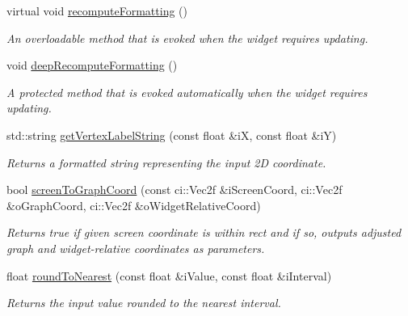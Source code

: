 \begin{DoxyCompactItemize}
\item 
\hypertarget{class_gui_plot_a718bfecbf285f346fb31cae1ab2cb085}{virtual void \hyperlink{class_gui_plot_a718bfecbf285f346fb31cae1ab2cb085}{recompute\-Formatting} ()}\label{class_gui_plot_a718bfecbf285f346fb31cae1ab2cb085}

\begin{DoxyCompactList}\small\item\em An overloadable method that is evoked when the widget requires updating. \end{DoxyCompactList}\item 
\hypertarget{class_gui_plot_aeb458e8d702ec1eed13ddf3f4fe1f492}{void \hyperlink{class_gui_plot_aeb458e8d702ec1eed13ddf3f4fe1f492}{deep\-Recompute\-Formatting} ()}\label{class_gui_plot_aeb458e8d702ec1eed13ddf3f4fe1f492}

\begin{DoxyCompactList}\small\item\em A protected method that is evoked automatically when the widget requires updating. \end{DoxyCompactList}\item 
\hypertarget{class_gui_plot_a0f3e7eb075608be8efbdc7a667e48f26}{std\-::string \hyperlink{class_gui_plot_a0f3e7eb075608be8efbdc7a667e48f26}{get\-Vertex\-Label\-String} (const float \&i\-X, const float \&i\-Y)}\label{class_gui_plot_a0f3e7eb075608be8efbdc7a667e48f26}

\begin{DoxyCompactList}\small\item\em Returns a formatted string representing the input 2\-D coordinate. \end{DoxyCompactList}\item 
\hypertarget{class_gui_plot_a6efee73c07e1a6eab9e574e3f875d2ad}{bool \hyperlink{class_gui_plot_a6efee73c07e1a6eab9e574e3f875d2ad}{screen\-To\-Graph\-Coord} (const ci\-::\-Vec2f \&i\-Screen\-Coord, ci\-::\-Vec2f \&o\-Graph\-Coord, ci\-::\-Vec2f \&o\-Widget\-Relative\-Coord)}\label{class_gui_plot_a6efee73c07e1a6eab9e574e3f875d2ad}

\begin{DoxyCompactList}\small\item\em Returns true if given screen coordinate is within rect and if so, outputs adjusted graph and widget-\/relative coordinates as parameters. \end{DoxyCompactList}\item 
\hypertarget{class_gui_plot_af3bbbc33672c3aa8d33566b4e215fb52}{float \hyperlink{class_gui_plot_af3bbbc33672c3aa8d33566b4e215fb52}{round\-To\-Nearest} (const float \&i\-Value, const float \&i\-Interval)}\label{class_gui_plot_af3bbbc33672c3aa8d33566b4e215fb52}

\begin{DoxyCompactList}\small\item\em Returns the input value rounded to the nearest interval. \end{DoxyCompactList}\end{DoxyCompactItemize}
